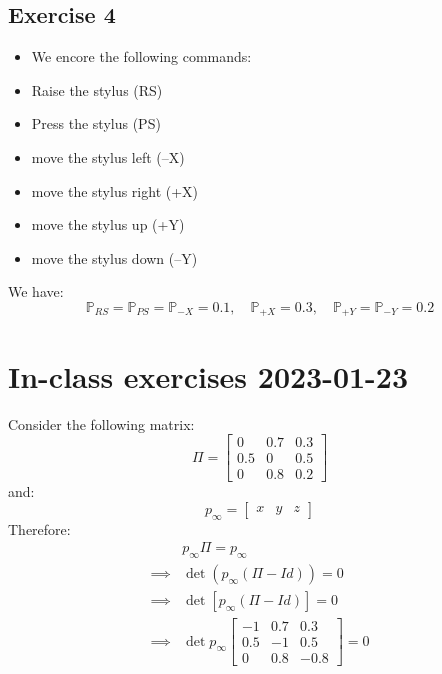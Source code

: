 \documentclass{article}
\newcommand{\1}{\mathbf{1}}
\renewcommand{\P}{\mathbb{P}}
\begin{document}
\subsection{Exercise 4}
\begin{itemize}
  \item We encore the following commands:
  \item Raise the stylus (RS)
  \item Press the stylus (PS)
  \item move the stylus left (–X)
  \item move the stylus right (+X)
  \item move the stylus up (+Y)
  \item move the stylus down (–Y)
\end{itemize}
We have:
$$
  \P_{RS} = \P_{PS} = \P_{-X} = 0.1, \quad \P_{+X} = 0.3, \quad \P_{+Y} = \P_{-Y} = 0.2
$$

\section{In-class exercises 2023-01-23}
Consider the following matrix:
$$
  \Pi =
  \begin{bmatrix}
    0   & 0.7 & 0.3 \\
    0.5 & 0   & 0.5 \\
    0   & 0.8 & 0.2
  \end{bmatrix}
$$
and:
$$
  p_\infty =
  \begin{bmatrix}
    x & y & z
  \end{bmatrix}
$$
Therefore:
\begin{align*}
           & p_\infty \Pi = p_\infty       \\
  \implies &
  \det(p_\infty (\Pi - Id)) = 0            \\
  \implies &
  \det\left[p_\infty (\Pi - Id)\right] = 0 \\
  \implies &
  \det p_\infty
  \begin{bmatrix}
    -1  & 0.7 & 0.3  \\
    0.5 & -1  & 0.5  \\
    0   & 0.8 & -0.8
  \end{bmatrix}
  = 0                                      \\
\end{align*}
\end{document}
